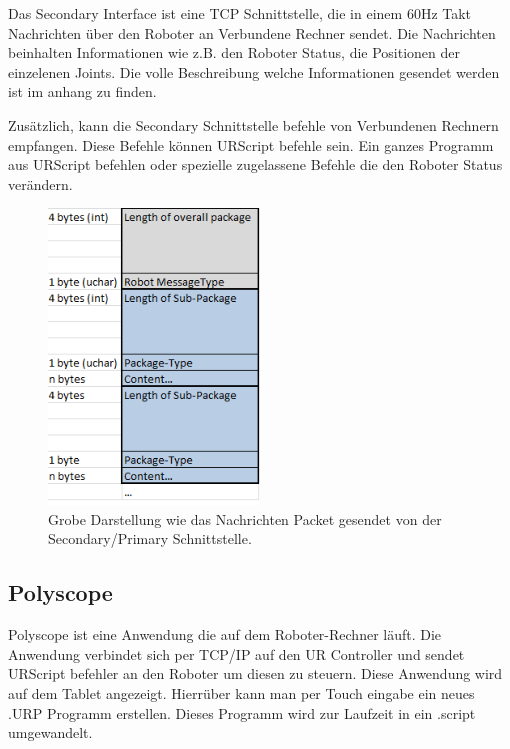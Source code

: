 Das Secondary Interface ist eine TCP Schnittstelle, die in einem 60Hz Takt Nachrichten über den Roboter an Verbundene Rechner sendet.
Die Nachrichten beinhalten Informationen wie z.B. den Roboter Status, die Positionen der einzelenen Joints.
Die volle Beschreibung welche Informationen gesendet werden ist im anhang zu finden.

Zusätzlich, kann die Secondary Schnittstelle befehle von Verbundenen Rechnern empfangen. 
Diese Befehle können URScript befehle sein. Ein ganzes Programm aus URScript befehlen oder spezielle zugelassene Befehle die den Roboter Status verändern.

\begin{figure}[ht]
  \centering
    \includegraphics[width=0.5\textwidth]{pic/secondary_datapackage_scheme.png}
      \caption[Schema des Datenpackets gesendet von der Secondary Schnittstelle]{Grobe Darstellung wie das Nachrichten Packet gesendet von der Secondary/Primary Schnittstelle.}
      \label{fig:datascheme_of_secondary_interface}
\end{figure}

\subsection{Polyscope}
\label{urcontrol_polyscope_gru}

Polyscope ist eine Anwendung die auf dem Roboter-Rechner läuft. Die Anwendung verbindet sich per TCP/IP auf den UR Controller und sendet URScript befehler an den Roboter um diesen zu steuern.
Diese Anwendung wird auf dem Tablet angezeigt. Hierrüber kann man per Touch eingabe ein neues .URP Programm erstellen. Dieses Programm wird zur Laufzeit in ein .script umgewandelt.

